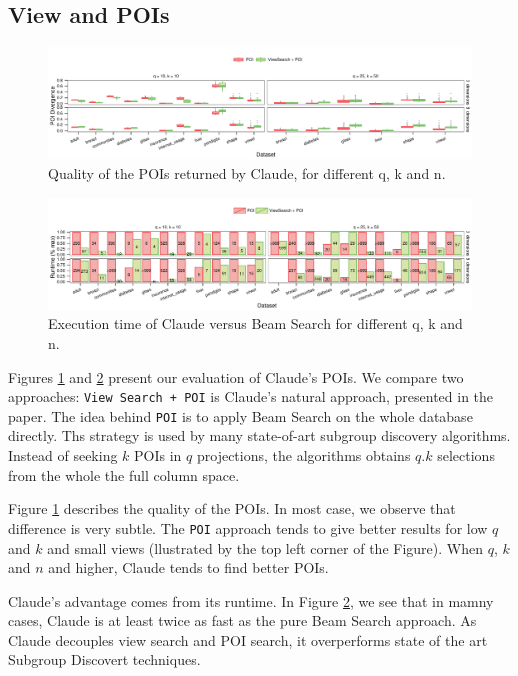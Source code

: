 \subsection{View and POIs}

\begin{figure}[t!]
\centering
\includegraphics[width=2\columnwidth]{plots/View-POI-Acc}
\caption{Quality of the POIs returned by Claude, for different q, k and n.}
\label{pic:quali-POIs}
\end{figure}
 
\begin{figure}[t!]
\centering
\includegraphics[width=2\columnwidth]{plots/View-POI-Time}
\caption{Execution time of Claude versus Beam Search for different q, k and n.} 
\label{pic:time-POIs}
\end{figure}

Figures \ref{pic:quali-POIs} and \ref{pic:time-POIs} present our evaluation of
Claude's POIs. We compare two approaches: \texttt{View Search + POI} is Claude's
natural approach, presented in the paper. The idea behind \texttt{POI} is to
apply Beam Search on the whole database directly. Ths strategy is used by many
state-of-art subgroup discovery algorithms. Instead of seeking $k$ POIs in $q$
projections, the algorithms obtains $q.k$ selections from the whole the full column
space.

Figure \ref{pic:quali-POIs} describes the quality of the POIs. In most case, we
observe that difference is very subtle. The \texttt{POI} approach tends to give
better results for low $q$ and $k$ and small views (llustrated by the top left
corner of the Figure). When $q$, $k$ and $n$ and higher, Claude tends to find
better POIs.

Claude's advantage comes from its runtime. In Figure \ref{pic:time-POIs}, we
see that in mamny cases, Claude is at least twice as fast as the pure Beam
Search approach. As Claude decouples view search and POI search, it
overperforms state of the art Subgroup Discovert techniques.
